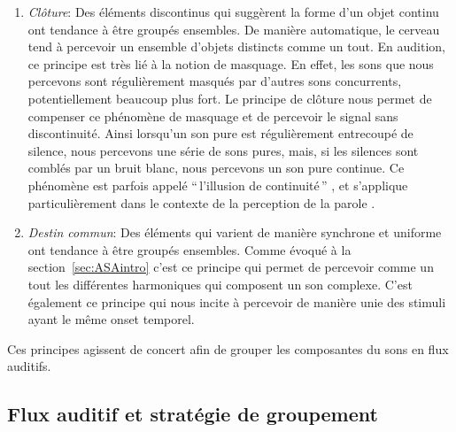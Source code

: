 \begin{enumerate}
\item \emph{Clôture}: Des éléments discontinus qui suggèrent la forme d'un objet continu ont tendance à être groupés ensembles. De manière automatique, le cerveau tend à percevoir un ensemble d'objets distincts comme un tout. En audition, ce principe est très lié à la notion de masquage. En effet, les sons que nous percevons sont régulièrement masqués par d'autres sons concurrents, potentiellement beaucoup plus fort. Le principe de clôture nous permet de compenser ce phénomène de masquage et de percevoir le signal sans discontinuité. Ainsi lorsqu'un son pure est régulièrement entrecoupé de silence, nous percevons une série de sons pures, mais, si les silences sont comblés par un bruit blanc, nous percevons un son pure continue. Ce phénomène est parfois appelé ``\,l’illusion de continuité\,'' \citep{dannenbring1976perceived}, et s'applique particulièrement dans le contexte de la perception de la parole \citep{carlyon2002continuity}.
\item \emph{Destin commun}: Des éléments qui varient de manière synchrone et uniforme ont tendance à être groupés ensembles. Comme évoqué à la section~\ref{sec:ASAintro} c'est ce principe qui permet de percevoir comme un tout les différentes harmoniques qui composent un son complexe. C'est également ce principe qui nous incite à percevoir de manière unie des stimuli ayant le même onset temporel.
\end{enumerate}

Ces principes agissent de concert afin de grouper les composantes du sons en flux auditifs.

\subsection{Flux auditif et stratégie de groupement}

